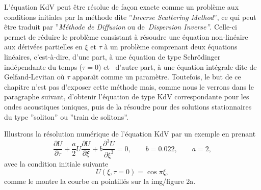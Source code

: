 \documentclass[10pt,thmsa]{article}
\begin{document}
L'\'{e}quation KdV peut \^{e}tre r\'{e}solue de fa\c{c}on exacte comme un
probl\`{e}me aux conditions initiales par la m\'{e}thode dite
''\textit{Inverse Scattering Method}'', ce qui peut \^{e}tre traduit par
''\textit{M\'{e}thode de Diffusion }ou de\textit{\ Dispersion Inverse''}.
Celle-ci permet de r\'{e}duire le probl\`{e}me consistant \`{a} r\'{e}soudre
une \'{e}quation non-lin\'{e}aire aux d\'{e}riv\'{e}es partielles en $\xi$ et
$\tau$ \`{a} un probl\`{e}me comprenant deux \'{e}quations lin\'{e}aires,
c'est-\`{a}-dire, d'une part, \`{a} une \'{e}quation de type Schr\"{o}dinger
ind\'{e}pendante du temps ($\tau=0$) et \ d'autre part, \`{a} une \'{e}quation
int\'{e}grale dite de Gelfand-Levitan o\`{u} $\tau$ appara\^{\i}t comme un
param\`{e}tre. Toutefois, le but de ce chapitre n'est pas d'exposer cette
m\'{e}thode mais, comme nous le verrons dans le paragraphe suivant, d'obtenir
l'\'{e}quation de type KdV correspondante pour les ondes acoustiques ioniques,
puis de la r\'{e}soudre pour des solutions stationnaires du type ''soliton''
ou ''train de solitons''.

Illustrons la r\'{e}solution num\'{e}rique de l'\'{e}quation KdV par un
exemple en prenant
\begin{equation}
\frac{\partial U}{\partial\tau}+\frac{a}{2}U\frac{\partial U}{\partial\xi
}+b\frac{\partial^{3}U}{\partial\xi^{3}}=0,\qquad b=0.022,\qquad
a=2,\label{AG12}%
\end{equation}
avec la condition initiale suivante
\begin{equation}
U(\xi,\tau=0)=\cos\pi\xi,\label{AH12}%
\end{equation}
comme le montre la courbe en pointill\'{e}s sur la img/figure 2a.%
\end{document}
